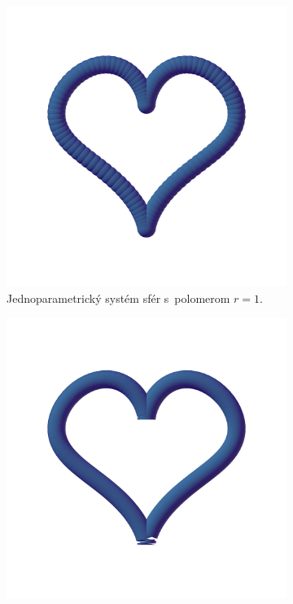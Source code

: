 \documentclass[12pt, twoside]{book}
\begin{document}
\begin{figure}[h]
    \centering
    \captionsetup{justification=centering}
	\captionsetup[subfigure]{justification=centering}
    \begin{subfigure}[t]{0.4\textwidth}
        \centering
        \includegraphics[width=\textwidth, trim=0mm 100mm 0mm 50mm, clip=true]{images/heart_spheres.png}
        	\caption{Jednoparametrický systém sfér s~polomerom $r=1$.}
        \label{fig:plocha11}
    \end{subfigure}
    \hspace{1em}%
    \begin{subfigure}[t]{0.4\textwidth}
        \centering
        \includegraphics[width=\textwidth, trim=0mm 100mm 0mm 50mm, clip=true]{images/heart_envelope_spheres.png}

\end{subfigure}
\end{figure}
\end{document}
